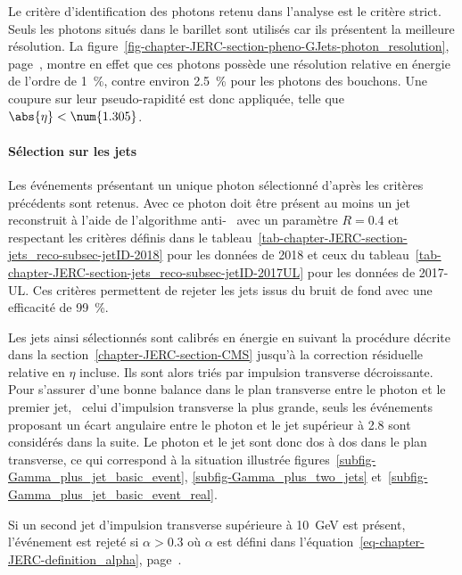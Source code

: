 \par Le critère d'identification des photons retenu dans l'analyse est le critère strict.
Seuls les photons situés dans le barillet sont utilisés car ils présentent la meilleure résolution.
La figure~\ref{fig-chapter-JERC-section-pheno-GJets-photon_resolution}, page~\pageref{fig-chapter-JERC-section-pheno-GJets-photon_resolution}, montre en effet que ces photons possède une résolution relative en énergie de l'ordre de \SI{1}{\%}, contre environ \SI{2.5}{\%} pour les photons des bouchons.
Une coupure sur leur pseudo-rapidité est donc appliquée, telle que $\abs{\eta} < \num{1.305}$.
\par {}
\paragraph{Sélection sur les jets}
Les événements présentant un unique photon sélectionné d'après les critères précédents sont retenus.
Avec ce photon doit être présent au moins un jet reconstruit à l'aide de l'algorithme anti-\kT~\cite{Cacciari_antikT} avec un paramètre $R=\num{0.4}$ et respectant les critères définis dans le tableau~\ref{tab-chapter-JERC-section-jets_reco-subsec-jetID-2018} pour les données de 2018 et ceux du tableau~\ref{tab-chapter-JERC-section-jets_reco-subsec-jetID-2017UL} pour les données de 2017-UL.
Ces critères permettent de rejeter les jets issus du bruit de fond avec une efficacité de \SI{99}{\%}.
\par Les jets ainsi sélectionnés sont calibrés en énergie en suivant la procédure décrite dans la section~\ref{chapter-JERC-section-CMS} jusqu'à la correction résiduelle relative en $\eta$ incluse. Ils sont alors triés par impulsion transverse décroissante.
Pour s'assurer d'une bonne balance dans le plan transverse entre le photon et le premier jet, \ie\ celui d'impulsion transverse la plus grande, seuls les événements proposant un écart angulaire entre le photon et le jet supérieur à \SI{2.8}{\rad} sont considérés dans la suite.
Le photon et le jet sont donc dos à dos dans le plan transverse, ce qui correspond à la situation illustrée figures~\ref{subfig-Gamma_plus_jet_basic_event}, \ref{subfig-Gamma_plus_two_jets} et~\ref{subfig-Gamma_plus_jet_basic_event_real}.
\par Si un second jet d'impulsion transverse supérieure à \SI{10}{\GeV} est présent, l'événement est rejeté si $\alpha>\num{0.3}$ où $\alpha$ est défini dans l'équation~\eqref{eq-chapter-JERC-definition_alpha}, page~\pageref{eq-chapter-JERC-definition_alpha}.

